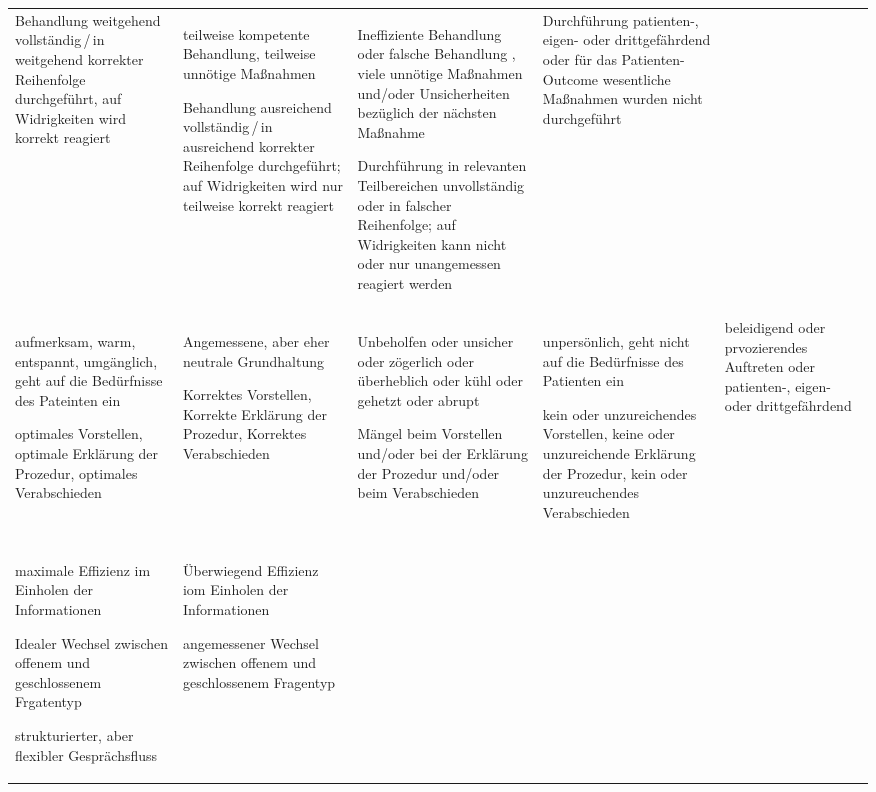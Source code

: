 \begin{gWideParEnv}
\begin{tabulary}{\linewidth}{LLLLL}
Behandlung weitgehend vollständig\,/\,in weitgehend korrekter Reihenfolge
durchgeführt, auf Widrigkeiten wird korrekt reagiert
&
teilweise kompetente Behandlung, teilweise unnötige Maßnahmen

Behandlung ausreichend vollständig\,/\,in ausreichend korrekter Reihenfolge
durchgeführt; auf Widrigkeiten wird nur teilweise korrekt reagiert
&
Ineffiziente Behandlung oder falsche Behandlung , viele unnötige Maßnahmen und/oder Unsicherheiten bezüglich
der nächsten Maßnahme

Durchführung in relevanten Teilbereichen unvollständig oder in falscher
Reihenfolge; auf Widrigkeiten kann nicht oder nur unangemessen
reagiert werden
&
Durchführung patienten-, eigen- oder drittgefährdend oder für das Patienten-Outcome
wesentliche  Maßnahmen
wurden nicht durchgeführt 
\\\addlinespace\hline\addlinespace
{}
\\\addlinespace
aufmerksam, warm, entspannt, umgänglich, geht auf die Bedürfnisse des Pateinten
ein

optimales Vorstellen, optimale Erklärung der Prozedur, optimales Verabschieden
&
Angemessene, aber eher neutrale Grundhaltung

Korrektes Vorstellen, Korrekte Erklärung der Prozedur, Korrektes Verabschieden
&
Unbeholfen oder unsicher oder zögerlich oder überheblich oder kühl oder
gehetzt oder abrupt

Mängel beim Vorstellen und/oder bei der Erklärung der Prozedur und/oder beim
Verabschieden
&
unpersönlich, geht nicht auf die Bedürfnisse des Patienten ein

kein oder unzureichendes Vorstellen, keine oder unzureichende Erklärung der
Prozedur, kein oder unzureuchendes Verabschieden
&
beleidigend oder prvozierendes Auftreten oder patienten-, eigen- oder
drittgefährdend 
\\\addlinespace\hline\addlinespace
{}
\\
maximale Effizienz im Einholen der Informationen

Idealer Wechsel zwischen offenem und geschlossenem Frgatentyp

strukturierter, aber flexibler Gesprächsfluss
&
Überwiegend Effizienz iom Einholen der Informationen

angemessener Wechsel zwischen offenem und geschlossenem Fragentyp


\end{tabulary}
\end{gWideParEnv}
